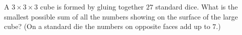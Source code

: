 A $3\times3\times3$ cube is formed by gluing together $27$ standard dice. What is the smallest possible sum of all the numbers showing on the surface of the large cube? (On a standard die the numbers on opposite faces add up to $7$.)
